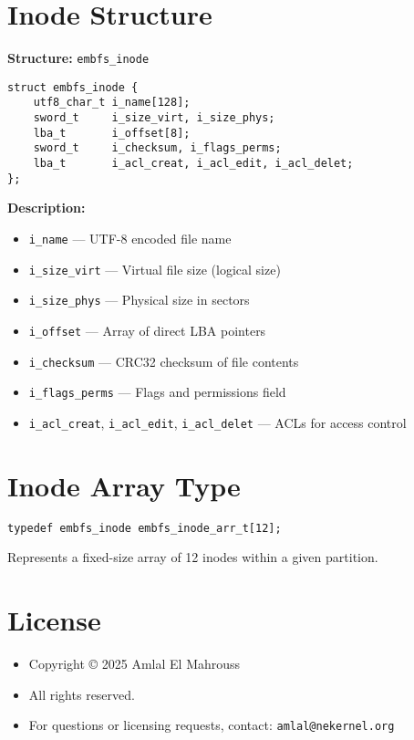 \documentclass{article}
\begin{document}
\section{Inode Structure}
\textbf{Structure:} \texttt{embfs\_inode}
\begin{lstlisting}
struct embfs_inode {
    utf8_char_t i_name[128];
    sword_t     i_size_virt, i_size_phys;
    lba_t       i_offset[8];
    sword_t     i_checksum, i_flags_perms;
    lba_t       i_acl_creat, i_acl_edit, i_acl_delet;
};
\end{lstlisting}

\textbf{Description:}
\begin{itemize}
    \item \texttt{i\_name} — UTF-8 encoded file name
    \item \texttt{i\_size\_virt} — Virtual file size (logical size)
    \item \texttt{i\_size\_phys} — Physical size in sectors
    \item \texttt{i\_offset} — Array of direct LBA pointers
    \item \texttt{i\_checksum} — CRC32 checksum of file contents
    \item \texttt{i\_flags\_perms} — Flags and permissions field
    \item \texttt{i\_acl\_creat}, \texttt{i\_acl\_edit}, \texttt{i\_acl\_delet} — ACLs for access control
\end{itemize}

\section{Inode Array Type}
\begin{lstlisting}
typedef embfs_inode embfs_inode_arr_t[12];
\end{lstlisting}
Represents a fixed-size array of 12 inodes within a given partition.

\section{License}
\begin{itemize}
    \item Copyright © 2025 Amlal El Mahrouss
    \item All rights reserved.
    \item For questions or licensing requests, contact: \texttt{amlal@nekernel.org}
\end{itemize}
\end{document}
